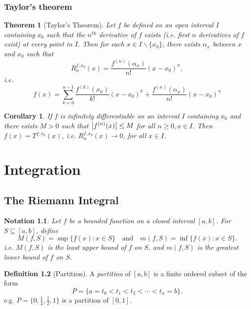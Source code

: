 \documentclass[12pt, lettersize]{book}
\theoremstyle{plain}
\newtheorem{thm}{Theorem}[section]
\newtheorem{nte}[thm]{Notation}
\newtheorem{cor}{Corollary}[thm]
\theoremstyle{definition}
\newtheorem{dfn}[thm]{Definition}
\theoremstyle{remark}
\begin{document}
		\subsection*{Taylor's theorem}
			\begin{thm}[Taylor's Theorem]
				Let $f$ be defined on an open interval $I$ containing $x_0$ such that the $n^\text{th}$ derivative of $f$ exists (i.e. first $n$ derivatives of $f$ exist) at every point in $I$. Then for each $x\in I\backslash\{x_0\}$, there exists $\alpha_x$ between $x$ and $x_0$ such that
				\begin{displaymath}
					R_n^{f,x_0}(x)=\frac{f^{(n)}(\alpha_x)}{n!}(x-x_0)^n,
				\end{displaymath}
				i.e.
				\begin{displaymath}
					f(x)=\sum_{k=0}^{n-1}\frac{f^{(k)}(x_0)}{k!}(x-x_0)^k+\frac{f^{(n)}(\alpha_x)}{n!}(x-x_0)^n
				\end{displaymath}
			\end{thm}
			
			\begin{cor}
			If $f$ is infinitely differentiable on an interval $I$ containing $x_0$ and there exists $M>0$ such that $\abs{f^{(n)}(x)}\leq M$ for all $n\geq0, x\in I$. Then $f(x)=T^{f,x_0}(x)$, i.e. $R_n^{f,x_0}(x)\rightarrow0$, for all $x\in I$.
			\end{cor}
	
	\chapter{Integration}
		\newpage
		\section{The Riemann Integral}
			\begin{nte}
			Let $f$ be a bounded function on a closed interval $[a,b]$. For $S\subseteq[a,b]$, define
			\begin{displaymath}
				M(f,S)=\sup\{f(x):x\in S\}\quad\text{and}\quad m(f,S)=\inf\{f(x):x\in S\}.
			\end{displaymath}
			i.e. $M(f,S)$ is the least upper bound of $f$ on $S$, and $m(f,S)$ is the greatest lower bound of $f$ on $S$.	
			\end{nte}
			
			\begin{dfn}[Partition]
			A \emph{partition} of $[a,b]$ is a finite ordered subset of the form
			\begin{displaymath}
				P=\{a=t_0<t_1<t_2<\cdots<t_n=b\}.
			\end{displaymath}
			e.g. $P=\{0,\frac{1}{4},\frac{1}{2},1\}$ is a partition of $[0,1]$.
			\end{dfn}
			
\end{document}
